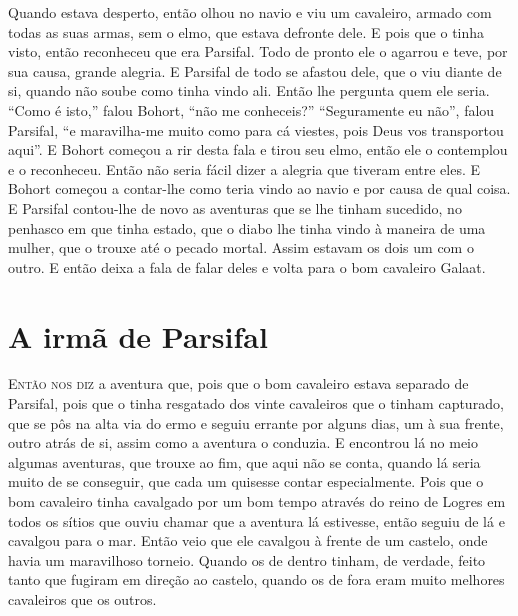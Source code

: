 Quando estava desperto, então olhou no navio e viu um cavaleiro, armado com
todas as suas armas, sem o elmo, que estava defronte dele. E pois que o tinha
visto, então reconheceu que era Parsifal. Todo de pronto ele o agarrou e teve,
por sua causa, grande alegria. E Parsifal de todo se afastou dele, que o viu
diante de si, quando não soube como tinha vindo ali. Então lhe pergunta quem
ele seria. “Como é isto,” falou Bohort, “não me conheceis?” “Seguramente eu
não”, falou Parsifal, “e maravilha-me muito como para cá viestes, pois Deus
vos transportou aqui”. E Bohort começou a rir desta fala e tirou seu elmo,
então ele o contemplou e o reconheceu. Então não seria fácil dizer a alegria
que tiveram entre eles. E Bohort começou a contar-lhe como teria vindo ao navio
e por causa de qual coisa. E Parsifal contou-lhe de novo as aventuras que se
lhe tinham sucedido, no penhasco em que tinha estado, que o diabo lhe tinha
vindo à maneira de uma mulher, que o trouxe até o pecado mortal. Assim estavam
os dois um com o outro. E então deixa a fala de falar deles e volta para o bom
cavaleiro Galaat.

\chapter{A irmã de Parsifal}

E\textsc{ntão nos diz} a aventura que, pois que o bom cavaleiro estava separado de
Parsifal, pois que o tinha resgatado dos vinte cavaleiros que o tinham
capturado, que se pôs na alta via do ermo e seguiu errante por alguns dias, um
à sua frente, outro atrás de si, assim como a aventura o conduzia. E
encontrou lá no meio algumas aventuras, que trouxe ao fim, que aqui não se
conta, quando lá seria muito de se conseguir, que cada um quisesse contar
especialmente. Pois que o bom cavaleiro tinha cavalgado por um bom tempo
através do reino de Logres em todos os sítios que ouviu chamar que a aventura
lá estivesse, então seguiu de lá e cavalgou para o mar. Então veio que ele
cavalgou à frente de um castelo, onde havia um maravilhoso torneio. Quando os
de dentro tinham, de verdade, feito tanto que fugiram em direção ao castelo,
quando os de fora eram muito melhores cavaleiros que os outros. 

